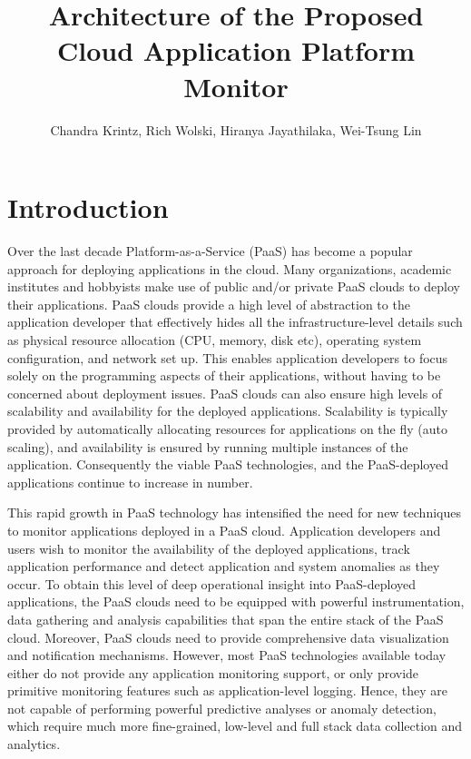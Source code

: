 \documentclass[11pt]{article}
\begin{document}
\title{Architecture of the Proposed Cloud Application Platform Monitor}
\author{Chandra Krintz, Rich Wolski, Hiranya Jayathilaka, Wei-Tsung Lin}
\maketitle

\section{Introduction}
Over the last decade Platform-as-a-Service (PaaS) has become a popular approach for deploying
applications in the cloud. Many organizations, academic institutes and hobbyists make use of public
and/or private PaaS clouds to deploy their applications.
PaaS clouds provide a high level of abstraction to the application developer that effectively hides
all the infrastructure-level details such as physical resource allocation (CPU, memory, disk etc), operating
system configuration, 
and network set up. This enables application developers to focus solely on the programming
aspects of their applications, without having to be concerned about deployment issues. PaaS
clouds can also ensure high levels of scalability and availability for the deployed applications. 
Scalability is typically provided by automatically allocating resources for applications
on the fly (auto scaling), and availability is ensured by running multiple instances of the application.
Consequently the viable PaaS technologies, and the PaaS-deployed applications
continue to increase in number.

This rapid growth in PaaS technology has intensified the need for new techniques to
monitor applications deployed in a PaaS cloud. Application developers and users wish
to monitor the availability of the deployed applications, track application performance and detect 
application and system anomalies as they occur. To obtain this level of deep operational insight into
PaaS-deployed applications, the PaaS clouds need to be equipped with powerful instrumentation,
data gathering and analysis capabilities that span the entire stack of the PaaS cloud. 
Moreover, PaaS clouds need to provide comprehensive
data visualization and notification mechanisms. However, most PaaS technologies available
today either do not provide any application monitoring support, or only provide primitive
monitoring features such as application-level logging. Hence, they are not capable of performing
powerful predictive analyses or anomaly detection, which require much more fine-grained, low-level
and full stack data collection and analytics. 
\end{document}
